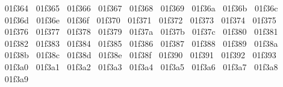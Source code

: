 {  ^^^^^^01f364%
  ^^^^^^01f365%
  ^^^^^^01f366%
  ^^^^^^01f367%
  ^^^^^^01f368%
  ^^^^^^01f369%
  ^^^^^^01f36a%
  ^^^^^^01f36b%
  ^^^^^^01f36c%
  ^^^^^^01f36d%
  ^^^^^^01f36e%
  ^^^^^^01f36f%
  ^^^^^^01f370%
  ^^^^^^01f371%
  ^^^^^^01f372%
  ^^^^^^01f373%
  ^^^^^^01f374%
  ^^^^^^01f375%
  ^^^^^^01f376%
  ^^^^^^01f377%
  ^^^^^^01f378%
  ^^^^^^01f379%
  ^^^^^^01f37a%
  ^^^^^^01f37b%
  ^^^^^^01f37c%
  ^^^^^^01f380%
  ^^^^^^01f381%
  ^^^^^^01f382%
  ^^^^^^01f383%
  ^^^^^^01f384%
  ^^^^^^01f385%
  ^^^^^^01f386%
  ^^^^^^01f387%
  ^^^^^^01f388%
  ^^^^^^01f389%
  ^^^^^^01f38a%
  ^^^^^^01f38b%
  ^^^^^^01f38c%
  ^^^^^^01f38d%
  ^^^^^^01f38e%
  ^^^^^^01f38f%
  ^^^^^^01f390%
  ^^^^^^01f391%
  ^^^^^^01f392%
  ^^^^^^01f393%
  ^^^^^^01f3a0%
  ^^^^^^01f3a1%
  ^^^^^^01f3a2%
  ^^^^^^01f3a3%
  ^^^^^^01f3a4%
  ^^^^^^01f3a5%
  ^^^^^^01f3a6%
  ^^^^^^01f3a7%
  ^^^^^^01f3a8%
  ^^^^^^01f3a9%
}
